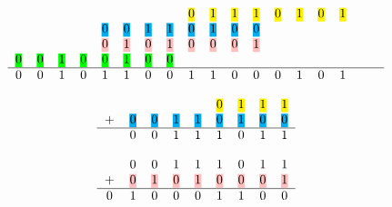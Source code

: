 \documentclass[11pt]{article}
\newcommand{\hlc}[2][yellow]{{%
    \colorlet{foo}{#1}%
    \sethlcolor{foo}\hl{#2}}%
}
\begin{document}
\begin{equation}
    \label{eq:16bit_add}
    \begin{tabular}{c c c c c c c c c c c c c c c c c c}
        &   &   &   &   &   &   &   & \hlc[yellow]{0} & \hlc[yellow]{1} & \hlc[yellow]{1} & \hlc[yellow]{1} & \hlc[yellow]{0} & \hlc[yellow]{1} & \hlc[yellow]{0} & \hlc[yellow]{1} & \\
        &   &   &   &  \hlc[cyan]{0} & \hlc[cyan]{0} & \hlc[cyan]{1} & \hlc[cyan]{1} & \hlc[cyan]{0} & \hlc[cyan]{1} & \hlc[cyan]{0} & \hlc[cyan]{0}&   &   &   &   &   &\\
        &   &   &   &  \hlc[pink]{0} & \hlc[pink]{1} & \hlc[pink]{0} & \hlc[pink]{1} & \hlc[pink]{0} & \hlc[pink]{0} & \hlc[pink]{0} & \hlc[pink]{1}&  &   &   &   &   \\
        \hlc[green]{0} & \hlc[green]{0} & \hlc[green]{1} & \hlc[green]{0} & \hlc[green]{0} & \hlc[green]{1} & \hlc[green]{0} & \hlc[green]{0}  &   &   &  &   &   &   &   \\
        \hline
        0 & 0 & 1 & 0 & 1 & 1 & 0 & 0 & 1 & 1 & 0 & 0 & 0 & 1 & 0 & 1 & \\

    \end{tabular} 
\end{equation}

\begin{equation}
    \label{eq:16bit_add1}
    \begin{tabular}{c c c c c c c c c }
                &   &   &   &   & \hlc[yellow]{0} & \hlc[yellow]{1} & \hlc[yellow]{1} & \hlc[yellow]{1} \\
            +   & \hlc[cyan]{0} & \hlc[cyan]{0} & \hlc[cyan]{1} & \hlc[cyan]{1} & \hlc[cyan]{0} & \hlc[cyan]{1} & \hlc[cyan]{0} & \hlc[cyan]{0} \\
                \hline
                & 0 & 0 & 1 & 1 & 1 & 0 & 1 & 1 \\
    \end{tabular} 
\end{equation}

\begin{equation}
    \label{eq:16bit_add2}
    \begin{tabular}{c c c c c c c c c c}
                & 0 & 0 & 1 & 1 & 1 & 0 & 1 & 1 \\
               + & \hlc[pink]{0} & \hlc[pink]{1} & \hlc[pink]{0} & \hlc[pink]{1} & \hlc[pink]{0} & \hlc[pink]{0} & \hlc[pink]{0} & \hlc[pink]{1} \\
                \hline
               0 & 1 & 0 & 0 & 0 & 1 & 1 & 0 & 0 \\
    \end{tabular} 
\end{equation}
\end{document}
